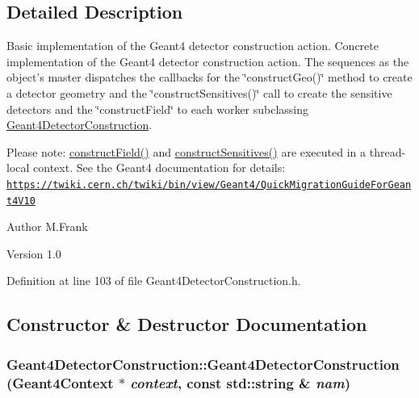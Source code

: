 \subsection{Detailed Description}
Basic implementation of the Geant4 detector construction action. Concrete implementation of the Geant4 detector construction action. The sequences as the object's master dispatches the callbacks for the \char`\"{}constructGeo()\char`\"{} method to create a detector geometry and the \char`\"{}constructSensitives()\char`\"{} call to create the sensitive detectors and the \char`\"{}constructField\char`\"{} to each worker subclassing \hyperlink{class_d_d4hep_1_1_simulation_1_1_geant4_detector_construction}{Geant4DetectorConstruction}.

Please note: \hyperlink{class_d_d4hep_1_1_simulation_1_1_geant4_detector_construction_af7b296f1aa62b4d836c6275108953208}{constructField()} and \hyperlink{class_d_d4hep_1_1_simulation_1_1_geant4_detector_construction_a852a3cd581f106a1f8c65122fb517dab}{constructSensitives()} are executed in a thread-\/local context. See the Geant4 documentation for details: \href{https://twiki.cern.ch/twiki/bin/view/Geant4/QuickMigrationGuideForGeant4V10}{\tt https://twiki.cern.ch/twiki/bin/view/Geant4/QuickMigrationGuideForGeant4V10}

\begin{DoxyAuthor}{Author}
M.Frank 
\end{DoxyAuthor}
\begin{DoxyVersion}{Version}
1.0 
\end{DoxyVersion}


Definition at line 103 of file Geant4DetectorConstruction.h.

\subsection{Constructor \& Destructor Documentation}
\hypertarget{class_d_d4hep_1_1_simulation_1_1_geant4_detector_construction_a82b863f888681245e472b87ead98c344}{
\subsubsection[{Geant4DetectorConstruction}]{\setlength{\rightskip}{0pt plus 5cm}Geant4DetectorConstruction::Geant4DetectorConstruction ({\bf Geant4Context} $\ast$ {\em context}, \/  const std::string \& {\em nam})}}
\label{class_d_d4hep_1_1_simulation_1_1_geant4_detector_construction_a82b863f888681245e472b87ead98c344}


